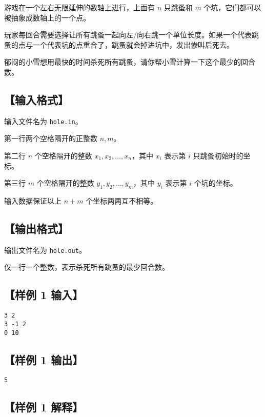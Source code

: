 \documentclass[11pt,a4paper,oneside]{article}
\begin{document}
游戏在一个左右无限延伸的数轴上进行，上面有 $n$ 只跳蚤和 $m$ 个坑，它们都可以被抽象成数轴上的一个点。

玩家每回合需要选择让所有跳蚤一起向左/向右跳一个单位长度。如果一个代表跳蚤的点与一个代表坑的点重合了，跳蚤就会掉进坑中，发出惨叫后死去。

郁闷的小雪想用最快的时间杀死所有跳蚤，请你帮小雪计算一下这个最少的回合数。

\subsection*{【输入格式】}

输入文件名为 \texttt{hole.in}。

第一行两个空格隔开的正整数 $n,m$。

第二行 $n$ 个空格隔开的整数 $x_1,x_2,\ldots,x_n$，其中 $x_i$ 表示第 $i$ 只跳蚤初始时的坐标。

第三行 $m$ 个空格隔开的整数 $y_1,y_2,\ldots,y_m$，其中 $y_i$ 表示第 $i$ 个坑的坐标。

输入数据保证以上 $n+m$ 个坐标两两互不相等。

\subsection*{【输出格式】}

输出文件名为 \texttt{hole.out}。

仅一行一个整数，表示杀死所有跳蚤的最少回合数。

\subsection*{【样例 1 输入】}

\begin{verbatim}
3 2
3 -1 2
0 10
\end{verbatim}

\subsection*{【样例 1 输出】}

\begin{verbatim}
5
\end{verbatim}

\subsection*{【样例 1 解释】}
\end{document}
